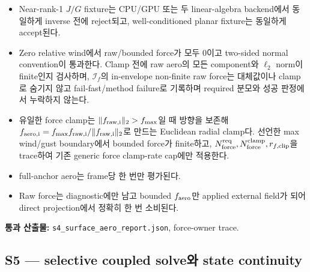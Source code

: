 \documentclass[10pt]{article}
\newcommand{\code}[1]{{\small\nolinkurl{#1}}}
\newcommand{\pass}[1]{\textcolor{GateGreen}{\textbf{#1}}}
\begin{document}
\begin{itemize}
  분모에 남기며 단순히 quality 평균에서 삭제하지 않는다.
  \item [\(\square\)] Near-rank-1 \(J/G\) fixture는 CPU/GPU 또는 두 linear-algebra backend에서
  동일하게 inverse 전에 reject되고, well-conditioned planar fixture는 동일하게 accept된다.
  \item [\(\square\)] Zero relative wind에서 raw/bounded force가 모두 0이고 two-sided normal convention이
  통과한다. Clamp 전에 raw aero의 모든 component와 \(\ell_2\) norm이 finite인지 검사하며,
  \(\mathcal I_f\)의 in-envelope non-finite raw force는 대체값이나 clamp로 숨기지 않고
  fail-fast/method failure로 기록하며 required 분모와 성공 판정에서 누락하지 않는다.
  \item [\(\square\)] 유일한 force clamp는
  \(\|f_{\rm raw,i}\|_2>f_{\max}\)일 때 방향을 보존해
  \(f_{\rm aero,i}=f_{\max}f_{\rm raw,i}/\|f_{\rm raw,i}\|_2\)로 만드는
  Euclidean radial clamp다. 선언한 max wind/gust boundary에서 bounded force가 finite하고,
  \(N_{\rm force}^{\rm req},N_{\rm force}^{\rm clamp},r_{f,\mathrm{clip}}\)을 trace하여
  기존 generic force clamp-rate cap에만 적용한다.
  \item [\(\square\)] full-anchor aero는 frame당 한 번만 평가된다.
  \item [\(\square\)] Raw force는 diagnostic에만 남고 bounded \(f_{\rm aero}\)만 applied external field가 되어
  direct projection에서 정확히 한 번 소비된다.
\end{itemize}

\pass{통과 산출물:} \code{s4\_surface\_aero\_report.json}, force-owner trace.

\subsection{S5 --- selective coupled solve와 state continuity}
\end{document}
